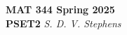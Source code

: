 \documentclass{article}
\begin{document}
 
{\bf MAT 344 Spring 2025} \\
{\bf PSET2}
{\it S. D. V. Stephens}
\hrulefill




\end{document}
